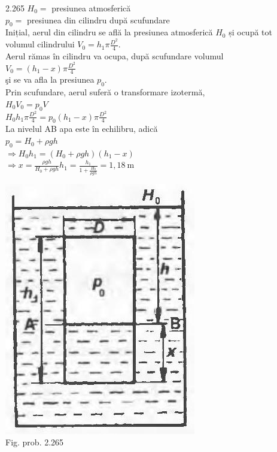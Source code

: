 2.265 $H_{0}=$ presiunea atmosferică\\ $p_{0}=$ presiunea din cilindru după scufundare\\ Inițial, aerul din cilindru se află la presiunea atmosferică $H_{0}$ și ocupă tot\\ volumul cilindrului $V_{0}=h_{1} \pi \frac{D^{2}}{4}$.\\ Aerul rămas în cilindru va ocupa, după scufundare volumul\\ $V_{0}=\left(h_{1}-x\right) \pi \frac{D^{2}}{4}$\\ şi se va afla la presiunea $p_{0}$.\\ Prin scufundare, aerul suferă o transformare izotermă,\\ $H_{0} V_{0}=p_{0} V$\\ $H_{0} h_{1} \pi \frac{D^{2}}{4}=p_{0}\left(h_{1}-x\right) \pi \frac{D^{2}}{4}$\\ La nivelul AB apa este în echilibru, adică\\ $p_{0}=H_{0}+\rho g h$\\ $\Rightarrow H_{0} h_{1}=\left(H_{0}+\rho g h\right)\left(h_{1}-x\right)$\\ $\Rightarrow x=\frac{\rho g h}{H_{0}+\rho g h} h_{1}=\frac{h_{1}}{1+\frac{H_{0}}{\rho g h}}=1,18 \mathrm{~m}$\\ \begin{center} \includegraphics[width=0.4\linewidth]{images/2025_07_01_5b3ff9fa0d508c8e9f17g-328}\\ Fig. prob. 2.265 \end{center}\\

